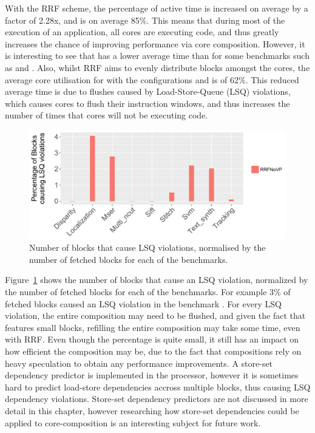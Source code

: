 With the RRF scheme, the percentage of active time is increased on average by a factor of 2.28x, and is on average 85\%.
This means that during most of the execution of an application, all cores are executing code, and thus greatly increases the chance of improving performance via core composition.
However, it is interesting to see that \nfvp{} has a lower average time than \nfnovp{} for some benchmarks such as  and .
Also, whilst RRF aims to evenly distribute blocks amongst the cores, the average core utilisation for  with the configurations \nfnovp{} and \nfvp{} is of 62\%.
This reduced average time is due to flushes caused by Load-Store-Queue (LSQ) violations, which causes cores to flush their instruction windows, and thus increases the number of times that cores will not be executing code.

\begin{figure}[t]
    \centering
    \includegraphics[width=1\textwidth]{chapter3/graphics/lsqViol4.pdf}
    \caption{Number of blocks that cause LSQ violations, normalised by the number of fetched blocks for each of the benchmarks.}
    \label{fig:lsqvio}
	\vspace{1em}
\end{figure}

Figure~\ref{fig:lsqvio} shows the number of blocks that cause an LSQ violation, normalized by the number of fetched blocks for each of the benchmarks.
For example 3\% of fetched blocks caused an LSQ violation in the benchmark .
For every LSQ violation, the entire composition may need to be flushed, and given the fact that  features small blocks, refilling the entire composition may take some time, even with RRF.
Even though the percentage is quite small, it still has an impact on how efficient the composition may be, due to the fact that compositions rely on heavy speculation to obtain any performance improvements.
A store-set dependency predictor is implemented in the processor, however it is sometimes hard to predict load-store dependencies accross multiple blocks, thus causing LSQ dependency violations.
Store-set dependency predictors are not discussed in more detail in this chapter, however researching how store-set dependencies could be applied to core-composition is an interesting subject for future work.

